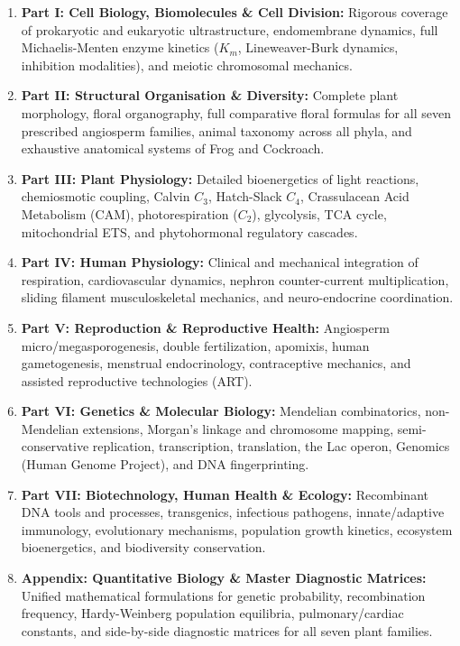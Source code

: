 \documentclass[10pt,twoside,openright]{book}
\begin{document}
\begin{enumerate}[leftmargin=*]
  \item \textbf{Part I: Cell Biology, Biomolecules \& Cell Division:} Rigorous coverage of prokaryotic and eukaryotic ultrastructure, endomembrane dynamics, full Michaelis-Menten enzyme kinetics ($K_m$, Lineweaver-Burk dynamics, inhibition modalities), and meiotic chromosomal mechanics.
  \item \textbf{Part II: Structural Organisation \& Diversity:} Complete plant morphology, floral organography, full comparative floral formulas for all seven prescribed angiosperm families, animal taxonomy across all phyla, and exhaustive anatomical systems of Frog and Cockroach.
  \item \textbf{Part III: Plant Physiology:} Detailed bioenergetics of light reactions, chemiosmotic coupling, Calvin $C_3$, Hatch-Slack $C_4$, Crassulacean Acid Metabolism (CAM), photorespiration ($C_2$), glycolysis, TCA cycle, mitochondrial ETS, and phytohormonal regulatory cascades.
  \item \textbf{Part IV: Human Physiology:} Clinical and mechanical integration of respiration, cardiovascular dynamics, nephron counter-current multiplication, sliding filament musculoskeletal mechanics, and neuro-endocrine coordination.
  \item \textbf{Part V: Reproduction \& Reproductive Health:} Angiosperm micro/megasporogenesis, double fertilization, apomixis, human gametogenesis, menstrual endocrinology, contraceptive mechanics, and assisted reproductive technologies (ART).
  \item \textbf{Part VI: Genetics \& Molecular Biology:} Mendelian combinatorics, non-Mendelian extensions, Morgan's linkage and chromosome mapping, semi-conservative replication, transcription, translation, the Lac operon, Genomics (Human Genome Project), and DNA fingerprinting.
  \item \textbf{Part VII: Biotechnology, Human Health \& Ecology:} Recombinant DNA tools and processes, transgenics, infectious pathogens, innate/adaptive immunology, evolutionary mechanisms, population growth kinetics, ecosystem bioenergetics, and biodiversity conservation.
  \item \textbf{Appendix: Quantitative Biology \& Master Diagnostic Matrices:} Unified mathematical formulations for genetic probability, recombination frequency, Hardy-Weinberg population equilibria, pulmonary/cardiac constants, and side-by-side diagnostic matrices for all seven plant families.
\end{enumerate}
\end{document}
